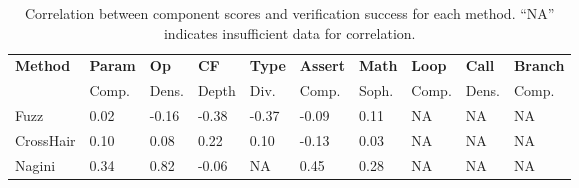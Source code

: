 \documentclass[8pt]{extarticle}
\begin{document}
\begin{table}[H]
\centering
\renewcommand{\arraystretch}{0.95}
\begin{tabular}{|p{1.1cm}|p{1cm}|p{1cm}|p{1cm}|p{1cm}|p{1cm}|p{1cm}|p{1cm}|p{1cm}|p{1cm}|}
\hline
\textbf{Method} & \textbf{Param} & \textbf{Op} & \textbf{CF} & \textbf{Type} & \textbf{Assert} & \textbf{Math} & \textbf{Loop} & \textbf{Call} & \textbf{Branch} \\
 & Comp. & Dens. & Depth & Div. & Comp. & Soph. & Comp. & Dens. & Comp. \\
\hline
Fuzz & 0.02 & -0.16 & -0.38 & -0.37 & -0.09 & 0.11 & NA & NA & NA \\
\hline
CrossHair & 0.10 & 0.08 & 0.22 & 0.10 & -0.13 & 0.03 & NA & NA & NA \\
\hline
Nagini & 0.34 & 0.82 & -0.06 & NA & 0.45 & 0.28 & NA & NA & NA \\
\hline
\end{tabular}
\caption{Correlation between component scores and verification success for each method. ``NA'' indicates insufficient data for correlation.}
\label{tab:diff-subscores-correlation}
\end{table}

\end{document}
